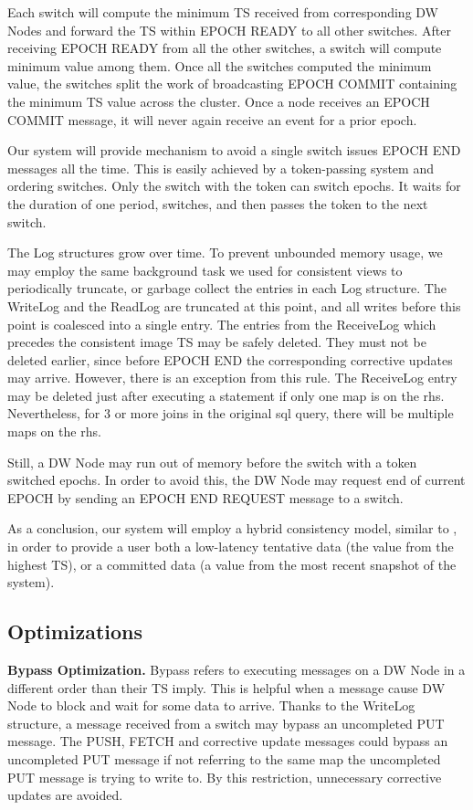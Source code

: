 \documentclass{sig-semester}
\begin{document}
Each switch will compute the minimum TS received from corresponding DW Nodes and forward the TS within EPOCH READY to all other switches. After receiving EPOCH READY from all the other switches, a switch will compute minimum value among them. Once all the switches computed the minimum value, the switches split the work of broadcasting EPOCH COMMIT containing the minimum TS value across the cluster. Once a node receives an EPOCH COMMIT message, it will never again receive an event for a prior epoch.

Our system will provide mechanism to avoid a single switch issues EPOCH END messages all the time. This is easily achieved by a token-passing system and ordering switches. Only the switch with the token can switch epochs. It waits for the duration of one period, switches, and then passes the token to the next switch.

The Log structures grow over time. To prevent unbounded memory usage, we may employ the same background task we used for consistent views to periodically truncate, or garbage collect the entries in each Log structure. The WriteLog and the ReadLog are truncated at this point, and all writes before this point is coalesced into a single entry. The entries from the ReceiveLog which precedes the consistent image TS may be safely deleted. They must not be deleted earlier, since before EPOCH END the corresponding corrective updates may arrive. However, there is an exception from this rule. The ReceiveLog entry may be deleted just after executing a statement if only one map is on the rhs. Nevertheless, for 3 or more joins in the original sql query, there will be multiple maps on the rhs.

Still, a DW Node may run out of memory before the switch with a token switched epochs. In order to avoid this, the DW Node may request end of current EPOCH by sending an EPOCH END REQUEST message to a switch.

As a conclusion, our system will employ a hybrid consistency model, similar to \cite{Bayou95}, in order to provide a user both a low-latency tentative data (the value from the highest TS), or a committed data (a value from the most recent snapshot of the system).

\subsection{Optimizations}
\textbf{Bypass Optimization.} Bypass refers to executing messages on a DW Node in a different order than their TS imply. This is helpful when a message cause DW Node to block and wait for some data to arrive. Thanks to the WriteLog structure, a message received from a switch may bypass an uncompleted PUT message. The PUSH, FETCH and corrective update messages could bypass an uncompleted PUT message if not referring to the same map the uncompleted PUT message is trying to write to. By this restriction, unnecessary corrective updates are avoided.
\end{document}
